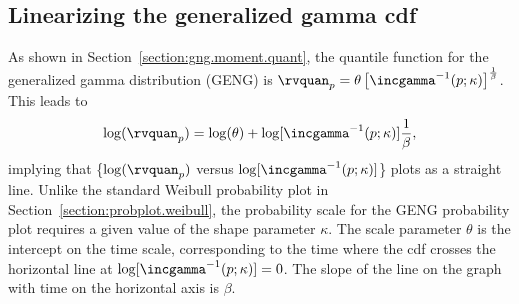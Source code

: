 \subsection{Linearizing the generalized gamma cdf}
\label{section:probplot.gng}
As shown in Section~\ref{section:gng.moment.quant}, the quantile
function for the generalized gamma distribution (GENG) is
$\rvquan_{p}=\theta \left[
\incgamma^{-1}(p;\kappa)\right]^{\frac{1}{\beta}}$.  This leads to
\begin{displaymath}
\log(\rvquan_{p})= \log(\theta)  + \log[\incgamma^{-1}(p;\kappa)]\frac{1}{\beta},
\end{displaymath}
implying that \{$\log(\rvquan_{p})$ versus
$\log[\incgamma^{-1}(p;\kappa)]$\} plots as a straight line.
Unlike the standard Weibull probability plot in
Section~\ref{section:probplot.weibull}, the probability scale for the
GENG probability plot requires a given value of the shape
parameter $\kappa$.  The scale parameter $\theta$ is the intercept on the
time scale, corresponding to the time where the cdf crosses the
horizontal line at $\log[\incgamma^{-1}(p;\kappa)]=0$. 
The slope of the line on the
graph with time on the horizontal axis is $\beta$. 



